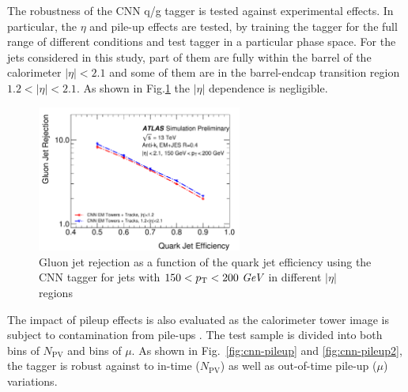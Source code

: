 The robustness of the CNN q/g tagger is tested against experimental effects. In particular, the $\eta$ and pile-up effects are tested,
by training the tagger for the full range of different conditions and test tagger in a particular phase space.
For the jets considered in this study, part of them are fully within the barrel of the calorimeter $|\eta|<2.1$ and some of them
are in the barrel-endcap transition region $1.2<|\eta|<2.1$. As shown in Fig.\ref{fig:cnn-tracktruth} the $|\eta|$ dependence is negligible. 


\begin{figure}[htpb]
\begin{center}
 \includegraphics[width=0.6\textwidth]{figures/CNN/ROC_pt150_200_eta.pdf}
\caption{Gluon jet rejection as a function of the quark jet efficiency using the CNN tagger for jets with $150<p_{{\rm T}}<200~\textit{GeV}$ in different $|\eta|$ regions}
\label{fig:cnn-tracktruth}
\end{center}
\end{figure}

The impact of pileup effects is also evaluated as the calorimeter tower image is subject to contamination from pile-ups
. The test sample is divided into both bins of $N_\text{PV}$
and bins of $\mu$. As shown in Fig.~\ref{fig:cnn-pileup} and \ref{fig:cnn-pileup2}, the tagger is robust against
to in-time ($N_\text{PV}$) as well as out-of-time pile-up ($\mu$) variations.

